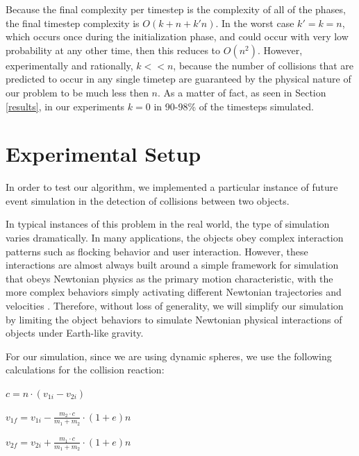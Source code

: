 \documentclass[CEJCS,PDF]{cej} %
\begin{document}
Because the final complexity per timestep is the complexity of all of the phases, the final timestep complexity is $O(k+n+k'n)$.  In the worst case $k'=k=n$, which occurs once during the initialization phase, and could occur with 
very low probability at any other time, then this reduces to $O(n^2)$.  However, experimentally and rationally, $k << n$, because the number of collisions
that are predicted to occur in any single timetep are guaranteed by the physical nature of our problem to be much less then $n$.  As a matter of fact, as seen in Section \ref{results}, in our experiments
$k=0$ in 90-98\% of the timesteps simulated.

\section{Experimental Setup}%

In order to test our algorithm, we implemented a particular instance of future event simulation in the detection of collisions between two objects.

In typical instances of this problem in the real world, the type of simulation varies dramatically. In many applications, the objects obey complex interaction patterns such as flocking behavior and user interaction.  However, these interactions are almost always built around a simple framework for simulation that obeys Newtonian physics as the primary motion characteristic, with the more complex
behaviors simply activating different Newtonian trajectories and velocities \cite{Jadbabaie02coordinationof}.  Therefore, without loss of generality, we will simplify our simulation by limiting the object behaviors to simulate Newtonian physical interactions of objects under Earth-like gravity.

For our simulation, since we are using dynamic spheres, we use the following calculations for the collision reaction\cite{wheatchex}:

\begin{math}
c = n \cdot (v_{1i} - v_{2i})
\end{math}

\begin{math}
v_{1f} = v_{1i} - \frac{m_2 \cdot c}{m_1 + m_2} \cdot (1 + e)n
\end{math}

\begin{math}
v_{2f} = v_{2i} + \frac{m_1 \cdot c}{m_1 + m_2} \cdot (1 + e)n
\end{math}
\end{document}

